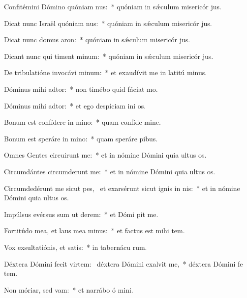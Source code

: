 \item Confitémini Dómino quóniam nus:~* quóniam in sǽculum misericór jus.
\item Dicat nunc Israël quóniam nus:~* quóniam in sǽculum misericór jus.
\item Dicat nunc domus aron:~* quóniam in sǽculum misericór jus.
\item Dicant nunc qui timent minum:~* quóniam in sǽculum misericór jus.
\item De tribulatióne invocávi minum:~* et exaudívit me in latitú minus.
\item Dóminus mihi adtor:~* non timébo quid fáciat  mo.
\item Dóminus mihi adtor:~* et ego despíciam ini os.
\item Bonum est confídere in mino:~* quam confíde  mine.
\item Bonum est speráre in mino:~* quam speráre  pibus.
\item Omnes Gentes circuirunt me:~* et in nómine Dómini quia ultus   os.
\item Circumdántes circumderunt me:~* et in nómine Dómini quia ultus   os.
\item Circumdedérunt me sicut pes,~\pscross{} et exarsérunt sicut ignis in nis:~* et in nómine Dómini quia ultus   os.
\item Impúlsus evérsus sum ut derem:~* et Dómi pit me.
\item Fortitúdo mea, et laus mea minus:~* et factus est mihi  tem.
\item Vox exsultatiónis, et satis:~* in tabernácu rum.
\item Déxtera Dómini fecit virtem:~\pscross{} déxtera Dómini exalvit me,~* déxtera Dómini fe tem.
\item Non móriar, sed vam:~* et narrábo ó mini.
